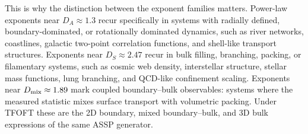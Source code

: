 \documentclass[11pt,a4paper]{article}
\begin{document}
This is why the distinction between the exponent families matters. Power-law exponents near $D_A\approx1.3$ recur specifically in systems with radially defined, boundary-dominated, or rotationally dominated dynamics, such as river networks, coastlines, galactic two-point correlation functions, and shell-like transport structures. Exponents near $D_S\approx2.47$ recur in bulk filling, branching, packing, or filamentary systems, such as cosmic web density, interstellar structure, stellar mass functions, lung branching, and QCD-like confinement scaling. Exponents near $D_{\rm mix}\approx1.89$ mark coupled boundary--bulk observables: systems where the measured statistic mixes surface transport with volumetric packing. Under TFOFT these are the 2D boundary, mixed boundary--bulk, and 3D bulk expressions of the same ASSP generator.
\end{document}
